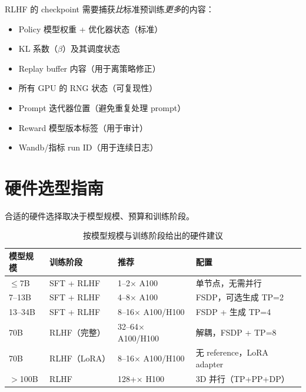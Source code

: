 \begin{keybox}
RLHF 的 checkpoint 需要捕获\emph{比}标准预训练\emph{更多}的内容：

\begin{itemize}
  \item Policy 模型权重 + 优化器状态（标准）
  \item KL 系数（$\beta$）及其调度状态
  \item Replay buffer 内容（用于离策略修正）
  \item 所有 GPU 的 RNG 状态（可复现性）
  \item Prompt 迭代器位置（避免重复处理 prompt）
  \item Reward 模型版本标签（用于审计）
  \item Wandb/指标 run ID（用于连续日志）
\end{itemize}
\end{keybox}

\section{硬件选型指南}
\label{sec:hardware-guide}

合适的硬件选择取决于模型规模、预算和训练阶段。

\begin{table}[ht!]
\centering\small
\caption{按模型规模与训练阶段给出的硬件建议}
\begin{tabularx}{0.88\linewidth}{@{}l Z{0.51} Z{1} Z{1.49}@{}}
\toprule
\textbf{模型规模} & \textbf{训练阶段} & \textbf{推荐} & \textbf{配置} \\
\midrule
$\leq$7B & SFT + RLHF & 1--2$\times$ A100 & 单节点，无需并行 \\
7--13B & SFT + RLHF & 4--8$\times$ A100 & FSDP，可选生成 TP=2 \\
13--34B & SFT + RLHF & 8--16$\times$ A100/H100 & FSDP + 生成 TP=4 \\
70B & RLHF（完整） & 32--64$\times$ A100/H100 & 解耦，FSDP + TP=8 \\
70B & RLHF（LoRA） & 8--16$\times$ A100/H100 & 无 reference，LoRA adapter \\
$>$100B & RLHF & 128+$\times$ H100 & 3D 并行（TP+PP+DP） \\
\bottomrule
\end{tabularx}
\end{table}

